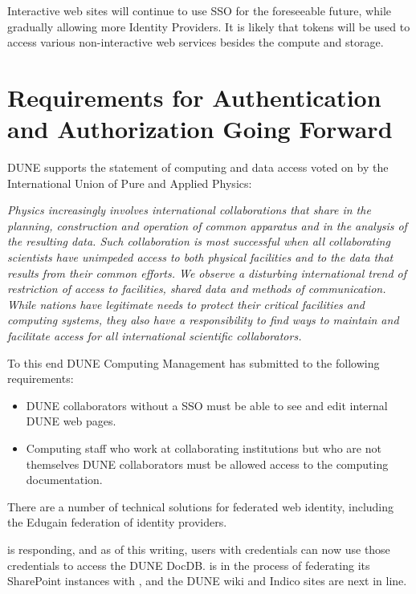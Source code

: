 \documentclass[../main-v1.tex]{subfiles}
\begin{document}
Interactive web sites will continue to use %
 SSO 
for the foreseeable future, while gradually allowing more Identity Providers. 
It is likely that  tokens will be used to access various non-interactive web
services besides the compute and storage. 
 

\section{Requirements for Authentication and Authorization Going Forward}

DUNE supports the statement of computing and data access voted on by the International Union of Pure and Applied Physics:

\textit{Physics increasingly involves international collaborations that share in the planning, construction and operation of common apparatus and in the analysis of the resulting data. Such collaboration is most successful when all collaborating scientists have unimpeded access to both physical facilities and to the data that results from their common efforts.  We observe a disturbing international trend of restriction of access to facilities,  shared data and methods of communication.  While nations have legitimate needs to protect their critical facilities  and computing systems, they also have a responsibility to find ways to maintain and facilitate access for all international scientific collaborators.}

To this end DUNE Computing Management has %
submitted to  the following requirements:

\begin{itemize}
    \item DUNE collaborators without a  SSO must be able to see and edit internal DUNE web pages.  
\item Computing staff who work at collaborating institutions but who are not themselves DUNE collaborators must be allowed access to the computing documentation.
 
\end{itemize}
There are a number of technical solutions for federated web identity, including the Edugain federation of identity providers. 

 is responding, and as of this writing, users with  credentials can now use those credentials to access the DUNE DocDB.  is in the process of federating its SharePoint instances with , and the DUNE wiki and Indico sites are next in line.
\end{document}
